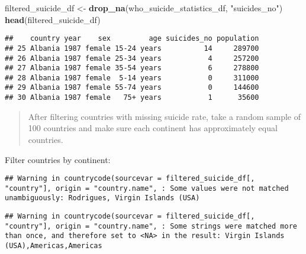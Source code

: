 \documentclass[]{article}
\newenvironment{Shaded}{\begin{snugshade}}{\end{snugshade}}
\newcommand{\DataTypeTok}[1]{\textcolor[rgb]{0.13,0.29,0.53}{#1}}
\newcommand{\KeywordTok}[1]{\textcolor[rgb]{0.13,0.29,0.53}{\textbf{#1}}}
\newcommand{\NormalTok}[1]{#1}
\newcommand{\OperatorTok}[1]{\textcolor[rgb]{0.81,0.36,0.00}{\textbf{#1}}}
\newcommand{\StringTok}[1]{\textcolor[rgb]{0.31,0.60,0.02}{#1}}
\begin{document}
\begin{Shaded}
\begin{Highlighting}[]
\NormalTok{filtered_suicide_df <-}\StringTok{ }\KeywordTok{drop_na}\NormalTok{(who_suicide_statistics_df, }\StringTok{"suicides_no"}\NormalTok{)}
\KeywordTok{head}\NormalTok{(filtered_suicide_df)}
\end{Highlighting}
\end{Shaded}

\begin{verbatim}
##    country year    sex         age suicides_no population
## 25 Albania 1987 female 15-24 years          14     289700
## 26 Albania 1987 female 25-34 years           4     257200
## 27 Albania 1987 female 35-54 years           6     278800
## 28 Albania 1987 female  5-14 years           0     311000
## 29 Albania 1987 female 55-74 years           0     144600
## 30 Albania 1987 female   75+ years           1      35600
\end{verbatim}

\begin{quote}
After filtering countries with missing suicide rate, take a random
sample of 100 countries and make sure each continent has approximately
equal countries.
\end{quote}

Filter countries by continent:

\begin{Shaded}
\end{Shaded}

\begin{verbatim}
## Warning in countrycode(sourcevar = filtered_suicide_df[, "country"], origin = "country.name", : Some values were not matched unambiguously: Rodrigues, Virgin Islands (USA)
\end{verbatim}

\begin{verbatim}
## Warning in countrycode(sourcevar = filtered_suicide_df[, "country"], origin = "country.name", : Some strings were matched more than once, and therefore set to <NA> in the result: Virgin Islands (USA),Americas,Americas
\end{verbatim}
\end{document}
